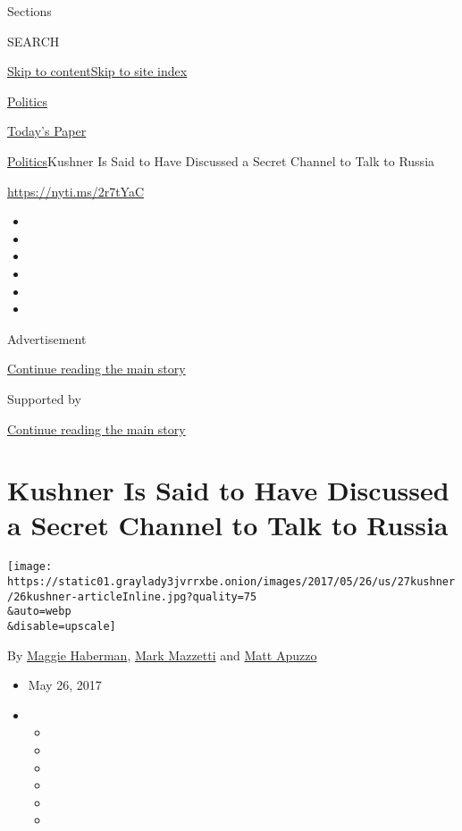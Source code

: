 Sections

SEARCH

\protect\hyperlink{site-content}{Skip to
content}\protect\hyperlink{site-index}{Skip to site index}

\href{https://www.nytimes3xbfgragh.onion/section/politics}{Politics}

\href{https://myaccount.nytimes3xbfgragh.onion/auth/login?response_type=cookie\&client_id=vi}{}

\href{https://www.nytimes3xbfgragh.onion/section/todayspaper}{Today's
Paper}

\href{/section/politics}{Politics}\textbar{}Kushner Is Said to Have
Discussed a Secret Channel to Talk to Russia

\url{https://nyti.ms/2r7tYaC}

\begin{itemize}
\item
\item
\item
\item
\item
\item
\end{itemize}

Advertisement

\protect\hyperlink{after-top}{Continue reading the main story}

Supported by

\protect\hyperlink{after-sponsor}{Continue reading the main story}

\hypertarget{kushner-is-said-to-have-discussed-a-secret-channel-to-talk-to-russia}{%
\section{Kushner Is Said to Have Discussed a Secret Channel to Talk to
Russia}\label{kushner-is-said-to-have-discussed-a-secret-channel-to-talk-to-russia}}

\texttt{[image: https://static01.graylady3jvrrxbe.onion/images/2017/05/26/us/27kushner/26kushner-articleInline.jpg?quality=75\\\&auto=webp\\\&disable=upscale]}

By \href{http://www.nytimes3xbfgragh.onion/by/maggie-haberman}{Maggie
Haberman},
\href{http://www.nytimes3xbfgragh.onion/by/mark-mazzetti}{Mark Mazzetti}
and \href{http://www.nytimes3xbfgragh.onion/by/matt-apuzzo}{Matt Apuzzo}

\begin{itemize}
\item
  May 26, 2017
\item
  \begin{itemize}
  \item
  \item
  \item
  \item
  \item
  \item
  \end{itemize}
\end{itemize}

